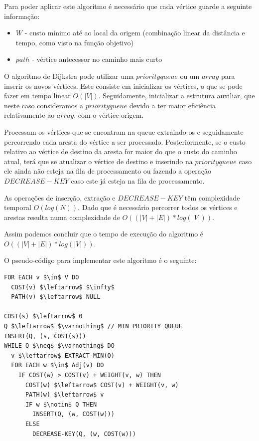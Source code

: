 \documentclass[article, a4paper, 12pt, oneside]{memoir}
\begin{document}
Para poder aplicar este algoritmo é necessário que cada vértice guarde a seguinte informação:
\begin{itemize}
	\item $W$ - custo mínimo até ao local da origem (combinação linear da distância e tempo, como visto na função objetivo)
	\item $path$ - vértice antecessor no caminho mais curto
\end{itemize}

O algoritmo de Dijkstra pode utilizar uma $priority queue$ ou um $array$ para inserir os novos vértices. 
Este consiste em inicializar os vértices, o que se pode fazer em tempo linear $O(|V|)$. Seguidamente, inicializar a estrutura auxiliar, que neste caso consideramos a $priority queue$ devido a ter maior eficiência relativamente ao $array$, com o vértice origem.

Processam os vértices que se encontram na queue extraindo-os e seguidamente percorrendo cada aresta do vértice a ser processado. Posteriormente, se o custo relativo ao vértice de destino da aresta for maior do que o custo do caminho atual, terá que se atualizar o vértice de destino e inserindo na $priority queue$ caso ele ainda não esteja na fila de processamento ou fazendo a operação $DECREASE-KEY$ caso este já esteja na fila de processamento.

As operações de inserção, extração e $DECREASE-KEY$ têm complexidade temporal $O(log(N))$. Dado que é necessário percorrer todos os vértices e arestas resulta numa complexidade de $O((|V| + |E|)*log(|V|))$.

Assim podemos concluir que o tempo de execução do algoritmo é $O((|V| + |E|)*log(|V|))$.

O pseudo-código para implementar este algoritmo é o seguinte:

\begin{lstlisting}[frame=single, mathescape=true]
FOR EACH v $\in$ V DO
  COST(v) $\leftarrow$ $\infty$
  PATH(v) $\leftarrow$ NULL

COST(s) $\leftarrow$ 0
Q $\leftarrow$ $\varnothing$ // MIN PRIORITY QUEUE
INSERT(Q, (s, COST(s)))
WHILE Q $\neq$ $\varnothing$ DO
  v $\leftarrow$ EXTRACT-MIN(Q)
  FOR EACH w $\in$ Adj(v) DO
    IF COST(w) > COST(v) + WEIGHT(v, w) THEN
      COST(w) $\leftarrow$ COST(v) + WEIGHT(v, w)
      PATH(w) $\leftarrow$ v
      IF w $\notin$ Q THEN
        INSERT(Q, (w, COST(w)))
      ELSE
        DECREASE-KEY(Q, (w, COST(w)))
\end{lstlisting}
\end{document}
